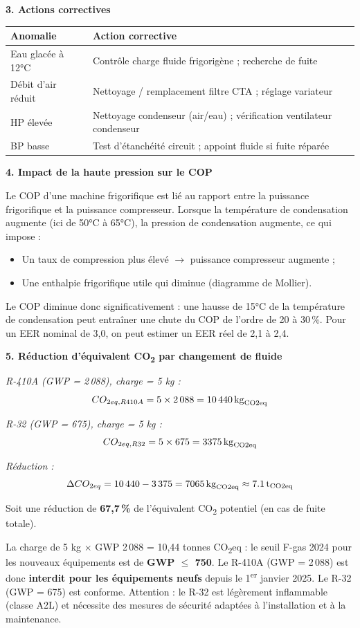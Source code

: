 \textbf{3. Actions correctives}

\begin{center}
\begin{tabular}{ll}
  \toprule
  Anomalie & Action corrective \\
  \midrule
  Eau glacée à 12°C & Contrôle charge fluide frigorigène ; recherche de fuite \\
  Débit d'air réduit & Nettoyage / remplacement filtre CTA ; réglage variateur \\
  HP élevée & Nettoyage condenseur (air/eau) ; vérification ventilateur condenseur \\
  BP basse & Test d'étanchéité circuit ; appoint fluide si fuite réparée \\
  \bottomrule
\end{tabular}
\end{center}

\textbf{4. Impact de la haute pression sur le COP}

Le COP d'une machine frigorifique est lié au rapport entre la puissance frigorifique et la puissance compresseur. Lorsque la température de condensation augmente (ici de 50°C à 65°C), la pression de condensation augmente, ce qui impose :
\begin{itemize}
  \item Un taux de compression plus élevé $\rightarrow$ puissance compresseur augmente ;
  \item Une enthalpie frigorifique utile qui diminue (diagramme de Mollier).
\end{itemize}
Le COP diminue donc significativement : une hausse de 15°C de la température de condensation peut entraîner une chute du COP de l'ordre de 20 à 30\,\%. Pour un EER nominal de 3,0, on peut estimer un EER réel de 2,1 à 2,4.

\textbf{5. Réduction d'équivalent CO\textsubscript{2} par changement de fluide}

\textit{R-410A (GWP = 2\,088), charge = 5 kg :}
$$CO_{2eq,R410A} = 5 \times 2\,088 = \SI{10\,440}{\kilogram_{CO2eq}}$$

\textit{R-32 (GWP = 675), charge = 5 kg :}
$$CO_{2eq,R32} = 5 \times 675 = \SI{3\,375}{\kilogram_{CO2eq}}$$

\textit{Réduction :}
$$\Delta CO_{2eq} = 10\,440 - 3\,375 = \SI{7\,065}{\kilogram_{CO2eq}} \approx \SI{7{,}1}{\tonne_{CO2eq}}$$

Soit une réduction de \textbf{67,7\,\%} de l'équivalent CO\textsubscript{2} potentiel (en cas de fuite totale).

La charge de 5 kg $\times$ GWP 2\,088 = 10,44 tonnes CO\textsubscript{2}eq : le seuil F-gas 2024 pour les nouveaux équipements est de \textbf{GWP $\leq$ 750}. Le R-410A (GWP = 2\,088) est donc \textbf{interdit pour les équipements neufs} depuis le 1\textsuperscript{er} janvier 2025. Le R-32 (GWP = 675) est conforme. Attention : le R-32 est légèrement inflammable (classe A2L) et nécessite des mesures de sécurité adaptées à l'installation et à la maintenance.

